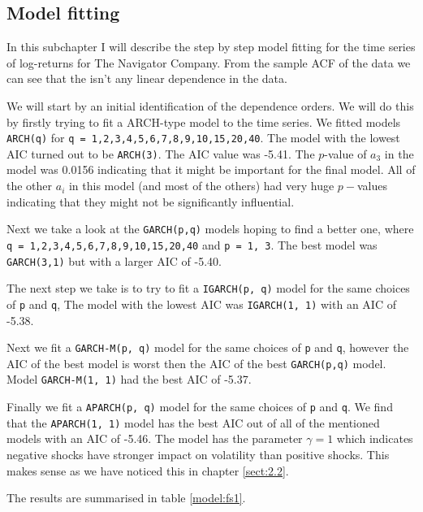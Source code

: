 \documentclass{article}
\begin{document}
\subsection{Model fitting}


In this subchapter I will describe the step by step model fitting for the time series of log-returns for The Navigator Company. From the sample ACF of the data we can see that the isn't any
linear dependence in the data.

We will start by an initial identification of the dependence orders. We will do this by firstly trying to fit a ARCH-type model to the time series. We fitted models \verb|ARCH(q)| for \verb|q = 1,2,3,4,5,6,7,8,9,10,15,20,40|. The model with the lowest AIC turned out to be \verb|ARCH(3)|. The AIC value was -5.41. The $p$-value of $a_3$ in the model was 0.0156 indicating that it might be important for the final model. All of the other $a_i$ in this model (and most of the others) had very huge $p-$values indicating that they might not be significantly influential.

Next we take a look at the \verb|GARCH(p,q)| models hoping to find a better one, where \verb|q = 1,2,3,4,5,6,7,8,9,10,15,20,40| and \verb|p = 1, 3|. The best model was  \verb|GARCH(3,1)| but with a larger AIC of  -5.40.

The next step we take is to try to fit a \verb|IGARCH(p, q)| model for the 
same choices of \verb|p| and \verb|q|,
The model with the lowest AIC was \verb|IGARCH(1, 1)| with an AIC of -5.38.

Next we fit a \verb|GARCH-M(p, q)| model for the same choices of \verb|p| and \verb|q|, however the AIC of the best model is worst then the AIC of the best \verb|GARCH(p,q)| model. Model \verb|GARCH-M(1, 1)| had the best AIC of -5.37.

Finally we fit a \verb|APARCH(p, q)| model for the same choices of \verb|p| and \verb|q|. We find that the \verb|APARCH(1, 1)| model has the best AIC out of all of the mentioned models with an AIC of -5.46. The model has the parameter $\gamma = 1$ which indicates negative shocks have stronger impact on volatility than
positive shocks. This makes sense as we have noticed this in chapter \ref{sect:2.2}. 

The results are summarised in table \ref{model:fs1}.
\end{document}
